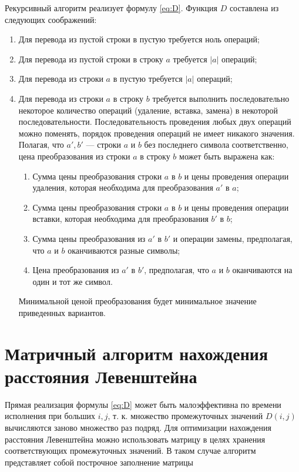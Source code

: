 \documentclass[12pt]{report}
\begin{document}
	
	Рекурсивный алгоритм реализует формулу \ref{eq:D}.
	Функция $D$ составлена из следующих соображений:
	\begin{enumerate}
		\item Для перевода из пустой строки в пустую требуется ноль операций;
		\item Для перевода из пустой строки в строку $a$ требуется $|a|$ операций;
		\item Для перевода из строки $a$ в пустую требуется $|a|$ операций;
		\item Для перевода из строки $a$ в строку $b$ требуется выполнить последовательно некоторое количество операций (удаление, вставка, замена) в некоторой последовательности. Последовательность проведения любых двух операций можно поменять, порядок проведения операций не имеет никакого значения. Полагая, что $a', b'$  — строки $a$ и $b$ без последнего символа соответственно, цена преобразования из строки $a$ в строку $b$ может быть выражена как:
		\begin{enumerate}
			\item Сумма цены преобразования строки $a$ в $b$ и цены проведения операции удаления, которая необходима для преобразования $a'$ в $a$;
			\item Сумма цены преобразования строки $a$ в $b$  и цены проведения операции вставки, которая необходима для преобразования $b'$ в $b$;
			\item Сумма цены преобразования из $a'$ в $b'$ и операции замены, предполагая, что $a$ и $b$ оканчиваются разные символы;
			\item Цена преобразования из $a'$ в $b'$, предполагая, что $a$ и $b$ оканчиваются на один и тот же символ.
		\end{enumerate}
		Минимальной ценой преобразования будет минимальное
		значение приведенных вариантов.
	\end{enumerate}
	
	\section{Матричный алгоритм нахождения расстояния Левенштейна}
	
	Прямая реализация формулы \ref{eq:D} может быть малоэффективна по времени исполнения при больших $i, j$, т. к. множество промежуточных значений $D(i, j)$ вычисляются заново множество раз подряд. Для оптимизации нахождения расстояния Левенштейна можно использовать матрицу в целях хранения соответствующих промежуточных значений. В таком случае алгоритм представляет собой построчное заполнение матрицы
	
\end{document}

